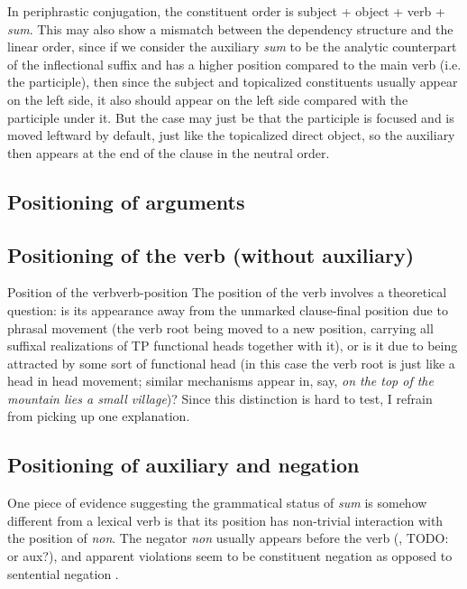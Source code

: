 \documentclass[a4paper, oneside, 12pt]{report}
\newcommand*{\citesec}[1]{\S~{#1}}
\newcommand*{\citepage}[1]{p.~{#1}}
\newcommand{\form}[1]{\emph{#1}}
\begin{document}
In periphrastic conjugation,
the constituent order is subject + object + verb + \form{sum}.
This may also show a mismatch between the dependency structure and the linear order,
since if we consider the auxiliary \form{sum} to be 
the analytic counterpart of the inflectional suffix 
and has a higher position compared to the main verb (i.e. the participle),
then since the subject and topicalized constituents usually appear on the left side, 
it also should appear on the left side compared with the participle under it.
But the case may just be that the participle is focused and is moved leftward by default, 
just like the topicalized direct object,
so the auxiliary then appears at the end of the clause in the neutral order.

\subsection{Positioning of arguments}

\subsection{Positioning of the verb (without auxiliary)}

\begin{infobox}{Position of the verb}{verb-position}
    The position of the verb involves a theoretical question:
    is its appearance away from the unmarked clause-final position
    due to phrasal movement 
    (the verb root being moved to a new position, 
    carrying all suffixal realizations of 
    TP functional heads together with it),
    or is it due to being attracted by some sort of functional head
    (in this case the verb root is just like a head in head movement;
    similar mechanisms appear in, say, 
    \form{on the top of the mountain \emph{lies} a small village})?
    Since this distinction is hard to test, 
    I refrain from picking up one explanation.
\end{infobox}

\subsection{Positioning of auxiliary and negation}\label{sec:constituent-order.aux-neg}



One piece of evidence suggesting the grammatical status of \form{sum} 
is somehow different from a lexical verb 
is that its position has non-trivial interaction 
with the position of \form{non}.
The negator \form{non} usually appears before the verb 
(\citealt[\citesec{1.5}]{danckaert2017development}, TODO: or aux?),
and apparent violations seem to be constituent negation 
as opposed to sentential negation \citep[\citepage{43}]{danckaert2017development}.
\end{document}
